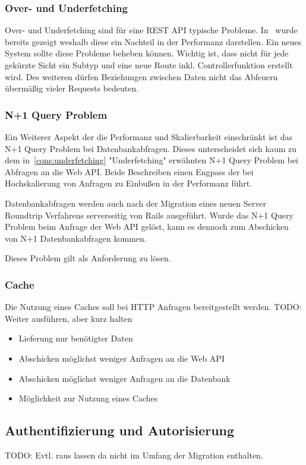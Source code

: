 \subsubsection{Over- und Underfetching}
Over- und Underfetching sind für eine REST API typische Probleme.
In~ wurde bereits gezeigt weshalb diese ein Nachteil in der Performanz darstellen.
Ein neues System sollte diese Probleme beheben können.
Wichtig ist, dass nicht für jede gekürzte Sicht ein Subtyp und eine neue Route inkl. Controllerfunktion erstellt wird. Des weiteren dürfen Beziehungen zwischen Daten nicht das Abfeuern übermäßig vieler Requests bedeuten.

\subsubsection{N+1 Query Problem}
Ein Weiterer Aspekt der die Performanz und Skalierbarkeit einschränkt ist das N+1 Query Problem bei Datenbankabfragen. Dieses unterscheidet sich kaum zu dem in~\ref{cons:underfetching} "Underfetching" erwähnten N+1 Query Problem bei Abfragen an die Web API. Beide Beschreiben einen Engpass der bei Hochskalierung von Anfragen zu Einbußen in der Performanz führt. 

Datenbankabfragen werden auch nach der Migration eines neuen Server Roundtrip Verfahrens serverseitig von Rails ausgeführt. Wurde das N+1 Query Problem beim Anfrage der Web API gelöst, kann es dennoch zum Abschicken von N+1 Datenbankabfragen kommen.

Dieses Problem gilt als Anforderung zu lösen.

\subsubsection{Cache}
Die Nutzung eines Caches soll bei HTTP Anfragen bereitgestellt werden.
TODO: Weiter ausführen, aber kurz halten


\begin{itemize}
	\setlength\itemsep{-1em}
	\item Lieferung nur benötigter Daten
	\item Abschicken möglichst weniger Anfragen an die Web API
	\item Abschicken möglichst weniger Anfragen an die Datenbank
	\item Möglichkeit zur Nutzung eines Caches
\end{itemize}


\subsection{Authentifizierung und Autorisierung}
TODO: Evtl. raus lassen da nicht im Umfang der Migration enthalten.

